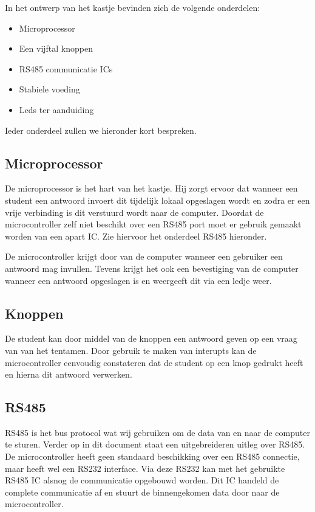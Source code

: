 In het ontwerp van het kastje bevinden zich de volgende onderdelen:
\begin{itemize}
  \item Microprocessor
  \item Een vijftal knoppen
  \item RS485 communicatie ICs
  \item Stabiele voeding
  \item Leds ter aanduiding
\end{itemize}
Ieder onderdeel zullen we hieronder kort bespreken.

\subsection{Microprocessor}
De microprocessor is het hart van het kastje. Hij zorgt ervoor dat wanneer een student een antwoord invoert dit tijdelijk lokaal opgeslagen wordt en zodra er een vrije verbinding is dit verstuurd wordt naar de computer. Doordat de microcontroller zelf niet beschikt over een RS485 port moet er gebruik gemaakt worden van een apart IC. Zie hiervoor het onderdeel RS485 hieronder.

De microcontroller krijgt door van de computer wanneer een gebruiker een antwoord mag invullen. Tevens krijgt het ook een bevestiging van de computer wanneer een antwoord opgeslagen is en weergeeft dit via een ledje weer.

\subsection{Knoppen}
De student kan door middel van de knoppen een antwoord geven op een vraag van van het tentamen. Door gebruik te maken van interupts kan de microcontroller eenvoudig constateren dat de student op een knop gedrukt heeft en hierna dit antwoord verwerken.

\subsection{RS485}
RS485 is het bus protocol wat wij gebruiken om de data van en naar de computer te sturen. Verder op in dit document staat een uitgebreideren uitleg over RS485. De microcontroller heeft geen standaard beschikking over een RS485 connectie, maar heeft wel een RS232 interface. Via deze RS232 kan met het gebruikte RS485 IC alsnog de communicatie opgebouwd worden. Dit IC handeld de complete communicatie af en stuurt de binnengekomen data door naar de microcontroller.

